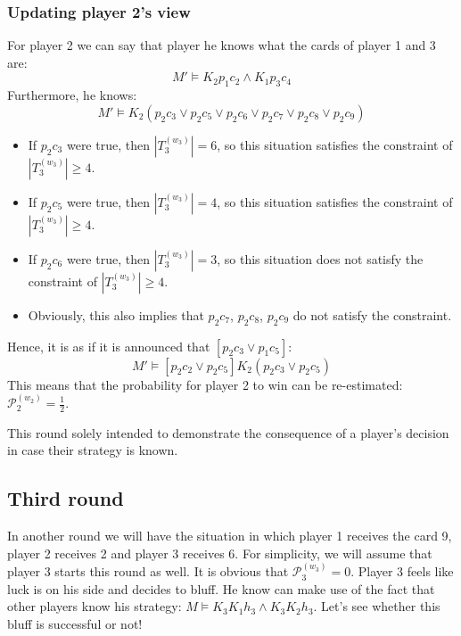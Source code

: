 \documentclass[a4paper,10pt]{article}
\begin{document}
\subsubsection{Updating player 2's view}
For player 2 we can say that player he knows what the cards of player 1 and 3 are: 
\begin{equation*}
M' \models K_2 p_1c_2 \wedge K_1p_3c_4 
\end{equation*}
Furthermore, he knows:
\begin{equation*}
 M' \models K_2(p_2 c_3 \vee p_2 c_5 \vee p_2 c_6 \vee p_2 c_7 \vee p_2 c_8 \vee p_2 c_9)
\end{equation*}
\begin{itemize}
 \item If $p_2 c_3$ were true, then $|T_3^{(w_3)}| = 6$, so this situation satisfies the constraint of $|T_3^{(w_3)}| \geq 4$.
 \item If $p_2 c_5$ were true, then $|T_3^{(w_3)}| = 4$, so this situation satisfies the constraint of $|T_3^{(w_3)}| \geq 4$.
 \item If $p_2 c_6$ were true, then $|T_3^{(w_3)}| = 3$, so this situation does not satisfy the constraint of $|T_3^{(w_3)}| \geq 4$.
 \item Obviously, this also implies that $p_2 c_7$, $p_2 c_8$, $p_2 c_9$ do not satisfy the constraint.   
\end{itemize}
Hence, it is as if it is announced that $[p_2 c_3 \vee p_1 c_5]$:
\begin{equation*}
M'\models [p_2 c_2 \vee p_2 c_5] K_2 (p_2 c_3 \vee p_2 c_5)
\end{equation*}
This means that the probability for player 2 to win can be re-estimated:$\mathcal{P}^{(w_2)}_2 = \frac{1}{2}$.

This round solely intended to demonstrate the consequence of a player's decision in case their strategy is known.

\subsection{Third round}
In another round we will have the situation in which player 1 receives the card 9, player 2 receives 2 and player 3 receives 6. For simplicity, we will assume that player 3 starts this round as well. It is obvious that $\mathcal{P}^{(w_3)}_3 = 0$. Player 3 feels like luck is on his side and decides to bluff. He know can make use of the fact that other players know his strategy: $M \models K_3 K_1 h_3 \wedge K_3 K_2 h_3$. Let's see whether this bluff is successful or not!
\end{document}

